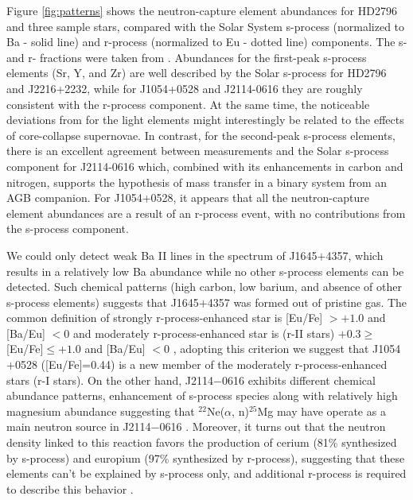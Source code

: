 Figure \ref{fig:patterns} shows the neutron-capture element abundances for HD2796 and three sample stars, compared with the Solar System s-process (normalized to Ba - solid line) and r-process (normalized to Eu - dotted line) components. The s- and r- fractions were taken from \citet{2000ApJ...544..302B}. Abundances for the first-peak s-process elements (Sr, Y, and Zr) are well described by the Solar s-process for HD2796 and J2216+2232, while for J1054+0528 and J2114-0616 they are roughly consistent with the r-process component. At the same time, the noticeable deviations from for the light elements might interestingly be related to the effects of core-collapse supernovae. In contrast, for the second-peak s-process elements, there is an excellent agreement between measurements and the Solar s-process component for J2114-0616 which, combined with its enhancements in carbon and nitrogen, supports the hypothesis of mass transfer in a binary system from an AGB companion. For J1054+0528, it appears that all the neutron-capture element abundances are a result of an r-process event, with no contributions from the s-process component.

We could only detect weak Ba II lines in the spectrum of J1645$+$4357, which results in a relatively low Ba abundance while no other s-process elements can be detected.
Such chemical patterns (high carbon, low barium, and absence of other s-process elements) suggests that J1645$+$4357 was formed out of pristine gas.
The common definition of strongly r-process-enhanced star is [Eu/Fe] $> +1.0$ and [Ba/Eu] $< 0$ and moderately r-process-enhanced star is (r-II stars) $+0.3 \geq$[Eu/Fe]$\leq +1.0$ and [Ba/Eu] $< 0$ \citep[e.g.,][]{2018ARNPS..68..237F}, 
adopting this criterion we suggest that J1054$+$0528 ([Eu/Fe]=0.44) is a new member of the moderately r-process-enhanced stars (r-I stars). On the other hand, J2114$-$0616 exhibits different chemical abundance patterns, 
enhancement of s-process species along with relatively high magnesium abundance
suggesting that $^{22}$Ne($\alpha$, n)$^{25}$Mg may have operate as a main neutron source in J2114$-$0616 \citep{2010A&A...509A..93M}.
Moreover, it turns out that the neutron density linked to this reaction favors the production of cerium (81\% synthesized by s-process) and europium (97\% synthesized by r-process),
suggesting that these elements can't be explained by s-process only, and additional r-process is required to describe this behavior \citep{1998ApJ...497..388G,2000A&A...362..599G}. 





